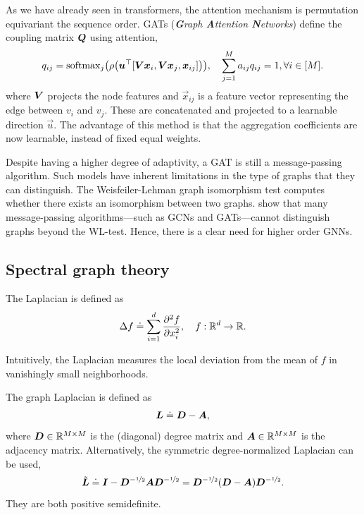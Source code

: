 As we have already seen in transformers, the attention mechanism is permutation equivariant \wrt
the sequence order. GATs
(\textit{\textbf{G}raph \textbf{A}ttention \textbf{N}etworks}) \citep{velivckovic2017graph} define
the coupling matrix $\bm{Q}$ using attention, \[
    q_{ij} = \mathrm{softmax}_j \lft( \rho \lft( \transpose{\vec{u}} [\mat{V} \vec{x}_i, \mat{V} \vec{x}_j, \vec{x}_{ij}] \rgt) \rgt), \quad \sum_{j=1}^{M} a_{ij}q_{ij} = 1, \forall i \in [M].
\]
where $\bm{V}$ projects the node features and $\vec{x}_{ij}$ is a feature vector representing the
edge between $v_i$ and $v_j$. These are concatenated and projected to a learnable direction
$\vec{u}$. The advantage of this method is that the aggregation coefficients are now learnable,
instead of fixed equal weights.

Despite having a higher degree of adaptivity, a GAT is still a message-passing algorithm. Such
models have inherent limitations in the type of graphs that they can distinguish. The
Weisfeiler-Lehman graph isomorphism test computes whether there exists an isomorphism between two
graphs. \citet{morris2019weisfeiler} show that many message-passing algorithms---such as GCNs and
GATs---cannot distinguish graphs beyond the WL-test. Hence, there is a clear need for higher order
GNNs.

\subsection{Spectral graph theory}

\begin{definition}
    The Laplacian is defined as \[
        \Delta f \doteq \sum_{i=1}^{d} \pdv[order=2]{f}{x_i}, \quad f: \mathbb{R}^d \to \mathbb{R}.
    \]
\end{definition}

Intuitively, the Laplacian measures the local deviation from the mean of $f$ in vanishingly small
neighborhoods.

\begin{definition}
    The graph Laplacian is defined as \[
        \bm{L} \doteq \bm{D} - \bm{A},
    \]
    where $\bm{D} \in \mathbb{R}^{M \times M}$ is the (diagonal) degree matrix and $\bm{A} \in \mathbb{R}^{M \times
            M}$ is the adjacency matrix. Alternatively, the symmetric degree-normalized Laplacian can be used, \[
        \tilde{\bm{L}} \doteq \bm{I} - \bm{D}^{-\nicefrac{1}{2}} \bm{A} \bm{D}^{-\nicefrac{1}{2}} = \bm{D}^{-\nicefrac{1}{2}} (\bm{D} - \bm{A}) \bm{D}^{-\nicefrac{1}{2}}.
    \]
    They are both positive semidefinite.
\end{definition}

